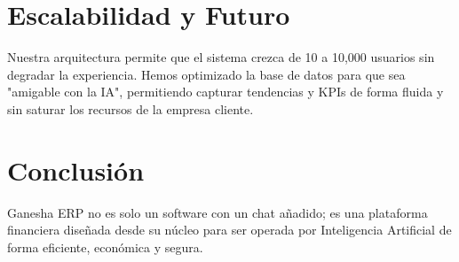 \documentclass[a4paper,12pt]{article}
\begin{document}
\section{Escalabilidad y Futuro}
Nuestra arquitectura permite que el sistema crezca de 10 a 10,000 usuarios sin degradar la experiencia. Hemos optimizado la base de datos para que sea "amigable con la IA", permitiendo capturar tendencias y KPIs de forma fluida y sin saturar los recursos de la empresa cliente.

\section{Conclusión}
Ganesha ERP no es solo un software con un chat añadido; es una plataforma financiera diseñada desde su núcleo para ser operada por Inteligencia Artificial de forma eficiente, económica y segura.
\end{document}
